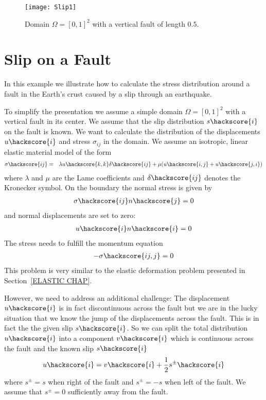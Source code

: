 \begin{figure} [ht]
\centerline{\texttt{[image: Slip1]}}
\caption{Domain $\Omega=[0,1]^2$ with a vertical fault of length $0.5$.}
\label{fig:slip.1}
\end{figure}

\section{Slip on a Fault}
\label{Slip CHAP}

In this example we illustrate how to calculate the stress distribution around a fault  in the 
Earth's crust caused by a slip  through an earthquake.

To simplify the presentation we assume a simple domain $\Omega=[0,1]^2$ with
a vertical fault in its center. We assume that the slip distribution $s\hackscore{i}$ on the fault is known. We want to calculate the distribution of the displacements $u\hackscore{i}$ and stress $\sigma_{ij}$ in the domain. We assume an isotropic, linear elastic material model of the form
\begin{eqnarray} \label{Slip  stress}
\sigma\hackscore{ij} & = & \lambda u\hackscore{k,k} \delta\hackscore{ij} + \mu ( u\hackscore{i,j} + u\hackscore{j,i})
\end{eqnarray}
where $\lambda$ and $\mu$ are the Lame coefficients 
 and $\delta\hackscore{ij}$ denotes the Kronecker symbol.
On the boundary the normal stress is given by
\begin{eqnarray} \label{Slip natural fault}
\sigma\hackscore{ij}n\hackscore{j}=0
\end{eqnarray}
and normal displacements are set to zero:
\begin{eqnarray} \label{Slip constraint}
u\hackscore{i}n\hackscore{i} =0 
\end{eqnarray}
The stress needs to fulfill the momentum equation
\begin{eqnarray}\label{Slip general problem}
- \sigma\hackscore{ij,j}=0
\end{eqnarray}
This problem is very similar to the elastic deformation problem presented in Section~\ref{ELASTIC CHAP}.

However, we need to address an additional challenge: The displacement $u\hackscore{i}$ is in fact discontinuous across the fault
but we are in the lucky situation that we know the jump of the displacements across the fault. This is
in fact the the given slip $s\hackscore{i}$. So we can split the total distribution $u\hackscore{i}$ into a component $v\hackscore{i}$ 
which is continuous across the fault and the known slip $s\hackscore{i}$
\begin{eqnarray}\label{Slip Split}
u\hackscore{i} = v\hackscore{i} + \frac{1}{2} s^{\pm}\hackscore{i}
\end{eqnarray}
where $s^{\pm}=s$ when right of the fault and $s^{\pm}=-s$ 
when left of the fault. We assume that $s^{\pm}=0$ sufficiently away from the fault.

